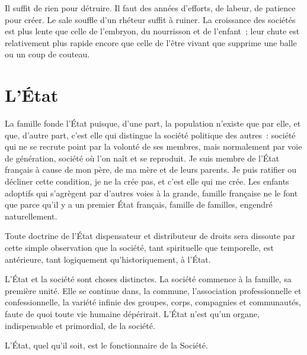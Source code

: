 \documentclass[french,twoside]{book} %
\newcommand{\astermono}{\medskip\centerline{\color{rubric}\large\selectfont{\syms ✻}}\medskip\par}%
\begin{document}
\astermono

\noindent Il suffit de rien pour détruire. Il faut des années d’efforts, de labeur, de patience pour créer. Le sale souffle d’un rhéteur suffit à ruiner. La croissance des sociétés est plus lente que celle de l’embryon, du nourrisson et de l’enfant ; leur chute est relativement plus rapide encore que celle de l’être vivant que supprime une balle ou un coup de couteau.
\section[{L’État}]{L’État}
\noindent La famille fonde l’État puisque, d’une part, la population n’existe que par elle, et que, d’autre part, c’est elle qui distingue la société politique des autres : société qui ne se recrute point par la volonté de ses membres, mais normalement par voie de génération, société où l’on naît et se reproduit. Je suis membre de l’État français à cause de mon père, de ma mère et de leurs parents. Je puis ratifier ou décliner cette condition, je ne la crée pas, et c’est elle qui me crée. Les enfants adoptifs qui s’agrègent par d’autres voies à la grande, famille française ne le font que parce qu’il y a un premier État français, famille de familles, engendré naturellement.\par

\astermono

\noindent Toute doctrine de l’État dispensateur et distributeur de droits sera dissoute par cette simple observation que la société, tant spirituelle que temporelle, est antérieure, tant logiquement qu’historiquement, à l’État.\par

\astermono

\noindent L’État et la société sont choses distinctes. La société commence à la famille, sa première unité. Elle se continue dans, la commune, l’association professionnelle et confessionnelle, la variété infinie des groupes, corps, compagnies et communautés, faute de quoi toute vie humaine dépérirait. L’État n’est qu’un organe, indispensable et primordial, de la société.\par

\astermono

\noindent L’État, quel qu’il soit, est le fonctionnaire de la Société.\par

\astermono
\end{document}
